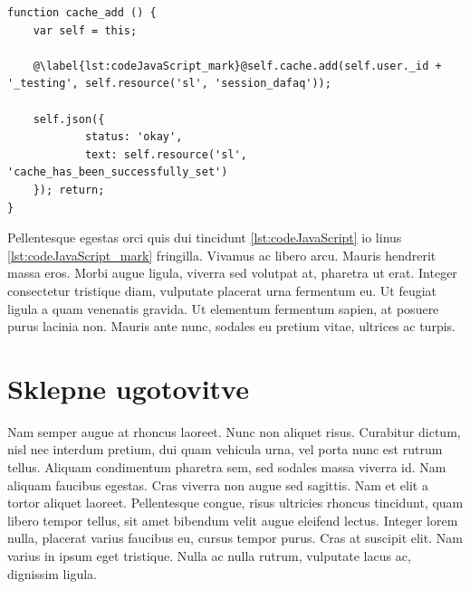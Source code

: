 \documentclass[a4paper, 12pt, twoside]{book}
\begin{document}
\begin{lstlisting}[caption={Interdum pretium}, label={lst:codeJavaScript}, title={Exampelus \ref{lst:codeJavaScript}: Interdum pretium}]
function cache_add () {
	var self = this;

	@\label{lst:codeJavaScript_mark}@self.cache.add(self.user._id + '_testing', self.resource('sl', 'session_dafaq'));

	self.json({
			status: 'okay',
			text: self.resource('sl', 'cache_has_been_successfully_set')
	}); return;
}
\end{lstlisting}

Pellentesque egestas orci quis dui tincidunt \ref{lst:codeJavaScript} io linus \ref{lst:codeJavaScript_mark} fringilla. Vivamus ac libero arcu. Mauris hendrerit massa eros. Morbi augue ligula, viverra sed volutpat at, pharetra ut erat. Integer consectetur tristique diam, vulputate placerat urna fermentum eu. Ut feugiat ligula a quam venenatis gravida. Ut elementum fermentum sapien, at posuere purus lacinia non. Mauris ante nunc, sodales eu pretium vitae, ultrices ac turpis.

\chapter{Sklepne ugotovitve}

Nam semper augue at rhoncus laoreet. Nunc non aliquet risus. Curabitur dictum, nisl nec interdum pretium, dui quam vehicula urna, vel porta nunc est rutrum tellus. Aliquam condimentum pharetra sem, sed sodales massa viverra id. Nam aliquam faucibus egestas. Cras viverra non augue sed sagittis. Nam et elit a tortor aliquet laoreet. Pellentesque congue, risus ultricies rhoncus tincidunt, quam libero tempor tellus, sit amet bibendum velit augue eleifend lectus. Integer lorem nulla, placerat varius faucibus eu, cursus tempor purus. Cras at suscipit elit. Nam varius in ipsum eget tristique. Nulla ac nulla rutrum, vulputate lacus ac, dignissim ligula.
\end{document}
